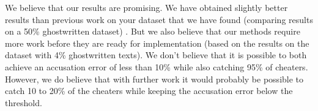 \documentclass[11pt]{article}
\begin{document}
    We believe that our results are promising. We have obtained slightly better
    results than previous work on your dataset that we have found (comparing
    results on a 50\% ghostwritten dataset) \citep{hansen2014,aalykke2016}. But
    we also believe that our methods require more work before they are ready for
    implementation (based on the results on the dataset with 4\% ghostwritten
    texts). We don't believe that it is possible to both achieve an accusation
    error of less than 10\% while also catching 95\% of cheaters. However, we
    do believe that with further work it would probably be possible to catch
    10 to 20\% of the cheaters while keeping the accusation error below the
    threshold.

    \newpage
    
    
\end{document}
